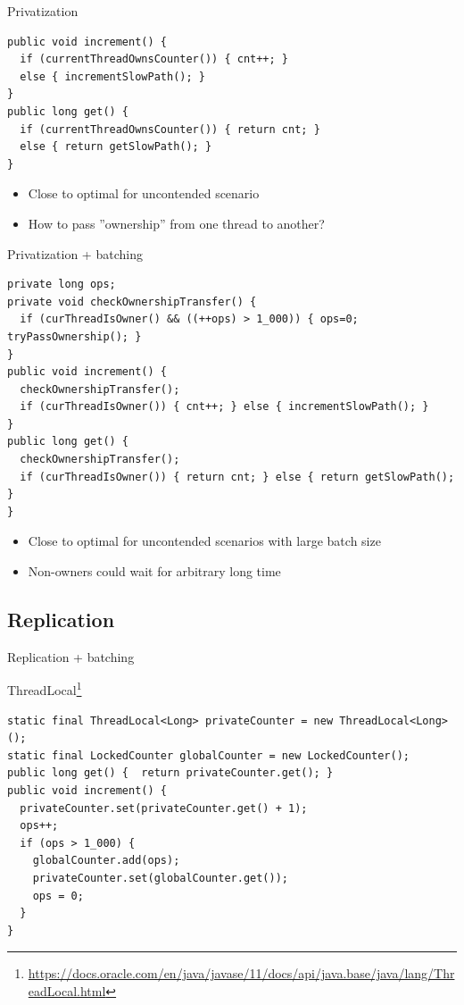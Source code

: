 \begin{frame}[fragile]{Privatization}
\begin{verbatim}
public void increment() { 
  if (currentThreadOwnsCounter()) { cnt++; } 
  else { incrementSlowPath(); }
}
public long get() { 
  if (currentThreadOwnsCounter()) { return cnt; } 
  else { return getSlowPath(); }
}
\end{verbatim}

\begin{itemize}
    \item Close to optimal for uncontended scenario
    \item How to pass ''ownership'' from one thread to another?
\end{itemize}
\end{frame}

\begin{frame}[fragile]{Privatization + batching}
\begin{verbatim}
private long ops;
private void checkOwnershipTransfer() { 
  if (curThreadIsOwner() && ((++ops) > 1_000)) { ops=0; tryPassOwnership(); } 
}
public void increment() { 
  checkOwnershipTransfer();
  if (curThreadIsOwner()) { cnt++; } else { incrementSlowPath(); }
}
public long get() { 
  checkOwnershipTransfer();
  if (curThreadIsOwner()) { return cnt; } else { return getSlowPath(); }
}
\end{verbatim}

\begin{itemize}
    \item Close to optimal for uncontended scenarios with large batch size
    \item Non-owners could wait for arbitrary long time
\end{itemize}
\end{frame}

\subsection{Replication}
\showTOCSub

\begin{frame}[t,fragile]{Replication + batching}

ThreadLocal\footnote{\tiny\url{https://docs.oracle.com/en/java/javase/11/docs/api/java.base/java/lang/ThreadLocal.html}}
\begin{verbatim}
static final ThreadLocal<Long> privateCounter = new ThreadLocal<Long>();
static final LockedCounter globalCounter = new LockedCounter();
public long get() {  return privateCounter.get(); }
public void increment() {
  privateCounter.set(privateCounter.get() + 1); 
  ops++;
  if (ops > 1_000) { 
    globalCounter.add(ops); 
    privateCounter.set(globalCounter.get()); 
    ops = 0; 
  }
}
\end{verbatim}
\end{frame}


